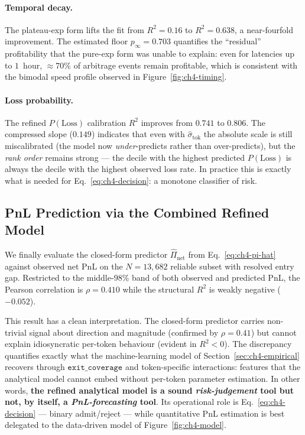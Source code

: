\documentclass[sigconf,nonacm,10pt]{acmart}
\begin{document}
\paragraph{Temporal decay.} The plateau-exp form lifts the fit from
$R^{2}\!=\!0.16$ to $R^{2}\!=\!0.638$, a near-fourfold improvement. The
estimated floor $p_{\infty}\!=\!0.703$ quantifies the ``residual''
profitability that the pure-exp form was unable to explain: even for
latencies up to $1$~hour, $\approx\!70\%$ of arbitrage events remain
profitable, which is consistent with the bimodal speed profile observed
in Figure~\ref{fig:ch4-timing}.

\paragraph{Loss probability.} The refined $P(\text{Loss})$ calibration
$R^{2}$ improves from $0.741$ to $\mathbf{0.806}$. The compressed slope
($0.149$) indicates that even with $\hat\sigma_{\text{tok}}$ the absolute
scale is still miscalibrated (the model now \emph{under}-predicts rather
than over-predicts), but the \emph{rank order} remains strong --- the
decile with the highest predicted $P(\text{Loss})$ is always the decile
with the highest observed loss rate. In practice this is exactly what is
needed for Eq.~\eqref{eq:ch4-decision}: a monotone classifier of risk.

\subsection{PnL Prediction via the Combined Refined Model}

We finally evaluate the closed-form predictor $\widehat{\Pi}_{\text{net}}$
from Eq.~\eqref{eq:ch4-pi-hat} against observed net PnL on the
$N=13{,}682$ reliable subset with resolved entry gap. Restricted to the
middle-98\% band of both observed and predicted PnL, the
Pearson correlation is $\rho\!=\!0.410$ while the structural
$R^{2}$ is weakly negative ($-0.052$).

This result has a clean interpretation. The closed-form predictor carries
non-trivial signal about direction and magnitude (confirmed by
$\rho\!=\!0.41$) but cannot explain idiosyncratic per-token behaviour
(evident in $R^{2}<0$). The discrepancy quantifies exactly what the
machine-learning model of Section~\ref{sec:ch4-empirical} recovers through
$\texttt{exit\_coverage}$ and token-specific interactions: features that
the analytical model cannot embed without per-token parameter estimation.
In other words, \textbf{the refined analytical model is a sound
\emph{risk-judgement} tool but not, by itself, a \emph{PnL-forecasting}
tool}. Its operational role is Eq.~\eqref{eq:ch4-decision} --- binary
admit/reject --- while quantitative PnL estimation is best delegated to
the data-driven model of Figure~\ref{fig:ch4-model}.
\end{document}
